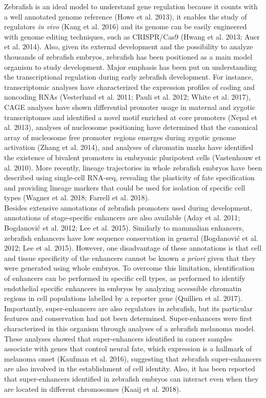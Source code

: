 Zebrafish is an ideal model to understand gene regulation because it counts with a well annotated genome reference (Howe et al. 2013), it enables the study of regulators \textit{in vivo} (Kang et al. 2016) and its genome can be easily engineered with genome editing techniques, such as CRISPR/Cas9 (Hwang et al. 2013; Auer et al. 2014). Also, given its external development and the possibility to analyze thousands of zebrafish embryos, zebrafish has been positioned as a main model organism to study development. Major emphasis has been put on understanding the transcriptional regulation during early zebrafish development. For instance, transcriptomic analyses have characterized the expression profiles of coding and noncoding RNAs (Vesterlund et al. 2011; Pauli et al. 2012; White et al. 2017), CAGE analyses have shown differential promoter usage in maternal and zygotic transcriptomes and identified a novel motif enriched at core promoters (Nepal et al. 2013), analyses of nucleosome positioning have determined that the canonical array of nucleosome free promoter regions emerges during zygotic genome activation (Zhang et al. 2014), and analyses of chromatin marks have identified the existence of bivalent promoters in embryonic pluripotent cells (Vastenhouw et al. 2010). More recently, lineage trajectories in whole zebrafish embryos have been described using single-cell RNA-seq, revealing the plasticity of fate specification and providing lineage markers that could be used for isolation of specific cell types (Wagner et al. 2018; Farrell et al. 2018).\\

Besides extensive annotations of zebrafish promoters used during development, annotations of stage-specific enhancers are also available (Aday et al. 2011; Bogdanović et al. 2012; Lee et al. 2015). Similarly to mammalian enhancers, zebrafish enhancers have low sequence conservation in general (Bogdanović et al. 2012; Lee et al. 2015). However, one disadvantage of these annotations is that cell and tissue specificity of the enhancers cannot be known \textit{a priori} given that they were generated using whole embryos. To overcome this limitation, identification of enhancers can be performed in specific cell types, as performed to identify  endothelial specific enhancers in embryos by analyzing accessible chromatin regions in cell populations labelled by a reporter gene (Quillien et al. 2017).\\

Importantly, super-enhancers are also regulators in zebrafish, but its particular features and conservation had not been determined. Super-enhancers were first characterized in this organism through analyses of a zebrafish melanoma model. These analyses showed that super-enhancers identified in cancer samples associate with genes that control neural fate, which expression is a hallmark of melanoma onset (Kaufman et al. 2016), suggesting that zebrafish super-enhancers are also involved in the establishment of cell identity. Also, it has been reported that super-enhancers identified in zebrafish embryos can interact even when they are located in different chromosomes (Kaaij et al. 2018).\\

